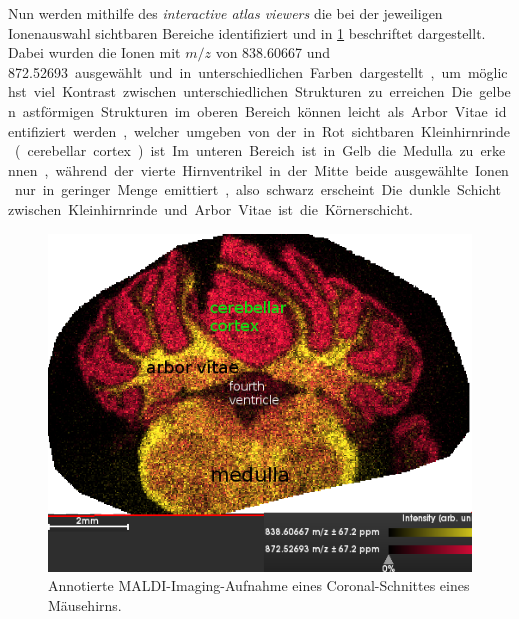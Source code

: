 Nun werden mithilfe des \emph{interactive atlas viewers} die bei der jeweiligen Ionenauswahl sichtbaren Bereiche identifiziert und in \cref{fig:hirn-ann} beschriftet dargestellt.
Dabei wurden die Ionen mit $m/z$ von \SI{838.60667}{} und \SI{872.52693} ausgewählt und in unterschiedlichen Farben dargestellt, um möglichst viel Kontrast zwischen unterschiedlichen Strukturen zu erreichen.

Die gelben astförmigen Strukturen im oberen Bereich können leicht als Arbor Vitae identifiziert werden, welcher umgeben von der in Rot sichtbaren Kleinhirnrinde (cerebellar cortex) ist.
Im unteren Bereich ist in Gelb die Medulla zu erkennen, während der  vierte Hirnventrikel in der Mitte beide ausgewählte Ionen nur in geringer Menge emittiert, also schwarz erscheint. %
Die dunkle Schicht zwischen Kleinhirnrinde und Arbor Vitae ist die Körnerschicht.

\begin{figure}[!ht]
    \centering
    \includegraphics[width=1\textwidth]{raw/hirn/Hirn872-838_ann}
    \caption{Annotierte MALDI-Imaging-Aufnahme eines Coronal-Schnittes eines Mäusehirns.}
    \label{fig:hirn-ann}
\end{figure}
